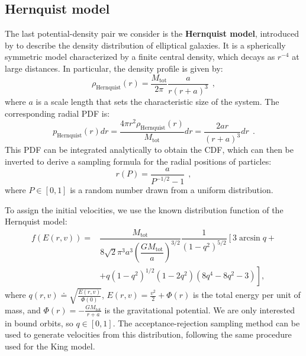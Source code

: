 \documentclass[fleqn,usenatbib]{mnras}
\begin{document}
\subsection{Hernquist model}\label{sec:Hernquist_model}
The last potential-density pair we consider is the \textbf{Hernquist model}, introduced by \cite{Hernquist1990} to describe the density distribution of elliptical galaxies.
It is a spherically symmetric model characterized by a finite central density, which decays as $r^{-4}$ at large distances. 
In particular, the density profile is given by:
\begin{equation}
    \rho_\text{Hernquist}(r) = \dfrac{M_\text{tot}}{2\pi} \dfrac{a}{r \left(r+a\right)^3} \:\: ,
    \label{eq:hernquist_density}
\end{equation}
where $a$ is a scale length that sets the characteristic size of the system.
The corresponding radial PDF is:
\begin{equation}
    p_\text{Hernquist}(r)dr = \dfrac{4\pi r^2 \rho_\text{Hernquist}(r)}{M_\text{tot}}dr = 
    \dfrac{2ar}{\left(r+a\right)^3}dr \:\: .
    \label{eq:hernquist_radial_pdf}
\end{equation}
This PDF can be integrated analytically to obtain the CDF, which can then be inverted to derive a sampling formula for the radial positions of particles:
\begin{equation}
    r(P) = \dfrac{a}{P^{-1/2} - 1} \:\: ,
    \label{eq:hernquist_radial_sampling}
\end{equation}
where $P \in [0,1]$ is a random number drawn from a uniform distribution.
\vspace{0.5em}

To assign the initial velocities, we use the known distribution function of the Hernquist model:
\begin{equation}
    \begin{split}
    f\left(E(r,v)\right) =& \dfrac{M_\text{tot}}{8 \sqrt{2} \pi^3 a^3 \left(\dfrac{GM_\text{tot}}{a}\right)^{3/2}} \dfrac{1}{\left(1-q^2\right)^{5/2}} \left[3\arcsin{q} + \right. \\
    &\left. + q\left(1-q^2\right)^{1/2} \left(1-2q^2\right) \left(8q^4-8q^2-3\right) \right],
    \label{eq:hernquist_distribution_function}
    \end{split}
\end{equation}
where $q(r,v) \doteq \sqrt{\frac{E(r,v)}{\Phi(0)}}$, $E(r,v)=\frac{v^2}{2} + \Phi(r)$ is the total energy per unit of mass, and $\Phi(r) = -\frac{GM_\text{tot}}{r+a}$ is the gravitational potential.
We are only interested in bound orbits, so $q \in [0,1]$.
The acceptance-rejection sampling method can be used to generate velocities from this distribution, following the same procedure used for the King model.
\end{document}

